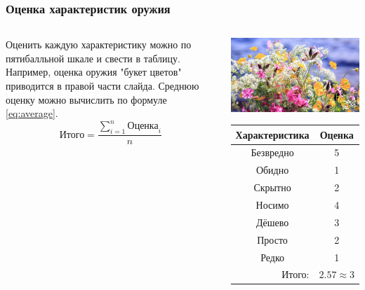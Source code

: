 \begin{frame}
    \frametitle{Оценка характеристик оружия}

    \begin{columns}
            Оценить каждую характеристику можно по пятибалльной шкале и свести в таблицу. Например, оценка оружия \alert{"букет цветов"} приводится в правой части слайда. Среднюю оценку можно вычислить по формуле \eqref{eq:average}. 
            \begin{equation}
                \label{eq:average}
                \text{Итого}=\frac{\displaystyle\sum_{i=1}^{n}\text{Оценка}_i}{n}
            \end{equation}
            
            
            \begin{center}
                \includegraphics[width=.4\textheight]{fig/flowers}
                
                \begin{tabular}{c|c}
                    \hline\hline
                    Характеристика              & Оценка\\ \hline\hline
                    Безвредно                   & 5 \\
                    Обидно                      & 1 \\
                    Скрытно                     & 2 \\
                    Носимо                      & 4 \\
                    Дёшево                      & 3 \\
                    Просто                      & 2 \\ 
                    Редко                       & 1 \\ \hline
                    \multicolumn{1}{r|}{Итого:} & $2.57\approx 3$ \\
                \end{tabular}
            \end{center}
    \end{columns}    
\end{frame}

